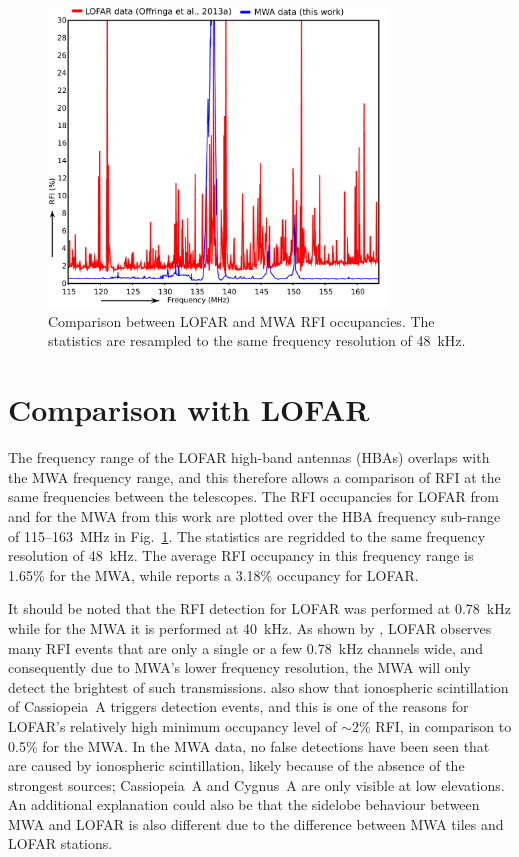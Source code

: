 \documentclass{pasa}
\begin{document}
\noindent\begin{figure}
\begin{center}\hspace*{-0.2cm}\includegraphics[width=9cm]{img/LOFAR-MWA-occupancy}
\caption{Comparison between LOFAR and MWA RFI occupancies. The statistics are resampled to the same frequency resolution of 48~kHz. }
\label{fig:lofar-mwa-occupancy}
\end{center}
\end{figure}

\section{Comparison with LOFAR} \label{ch:lofar-comparison}
The frequency range of the LOFAR high-band antennas (HBAs) overlaps with the MWA frequency range, and this therefore allows a comparison of RFI at the same frequencies between the telescopes. The RFI occupancies for LOFAR from \citet{lofar-radio-environment} and for the MWA from this work are plotted over the HBA frequency sub-range of 115--163~MHz in Fig.~\ref{fig:lofar-mwa-occupancy}. The statistics are regridded to the same frequency resolution of 48~kHz. The average RFI occupancy in this frequency range is 1.65\% for the MWA, while \citet{lofar-radio-environment} reports a 3.18\% occupancy for LOFAR.

It should be noted that the RFI detection for LOFAR was performed at 0.78~kHz while for the MWA it is performed at 40~kHz. As shown by \citet{lofar-radio-environment}, LOFAR observes many RFI events that are only a single or a few 0.78~kHz channels wide, and consequently due to MWA's lower frequency resolution, the MWA will only detect the brightest of such transmissions. \citet{lofar-radio-environment} also show that ionospheric scintillation of Cassiopeia~A triggers detection events, and this is one of the reasons for LOFAR's relatively high minimum occupancy level of $\sim2\%$ RFI, in comparison to 0.5\% for the MWA. In the MWA data, no false detections have been seen that are caused by ionospheric scintillation, likely because of the absence of the strongest sources; Cassiopeia~A and Cygnus~A are only visible at low elevations. An additional explanation could also be that the sidelobe behaviour between MWA and LOFAR is also different due to the difference between MWA tiles and LOFAR stations.
\end{document}

